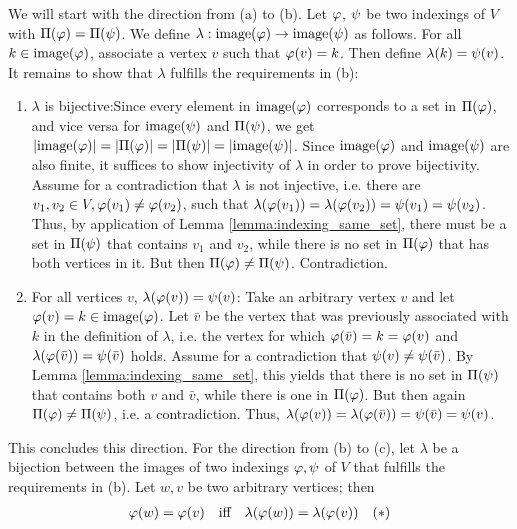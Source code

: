 \begin{\appendixproof}
    We will start with the direction from (a) to (b). Let $\varphi$, $\psi$ be two indexings of $V$ with $\Pi(\varphi) = \Pi(\psi)$. We define $\lambda : \mathrm{image}(\varphi)\rightarrow \mathrm{image}(\psi)$ as follows. For all $k \in \mathrm{image}(\varphi)$, associate a vertex $v$ such that $\varphi(v)=k$. Then define $\lambda(k)=\psi(v)$. It remains to show that $\lambda$ fulfills the requirements in (b):
    \begin{enumerate}
        \item $\lambda$ is bijective:\quad Since every element in $\mathrm{image}(\varphi)$ corresponds to a set in $\Pi(\varphi)$, and vice versa for $\mathrm{image}(\psi)$ and $\Pi(\psi)$, we get $|\mathrm{image}(\varphi)|=|\Pi(\varphi)|=|\Pi(\psi)|=|\mathrm{image}(\psi)|$. Since $\mathrm{image}(\varphi)$ and $\mathrm{image}(\psi)$ are also finite, it suffices to show injectivity of $\lambda$ in order to prove bijectivity. Assume for a contradiction that $\lambda$ is not injective, i.e. there are $v_1,v_2 \in V, \varphi(v_1) \neq \varphi(v_2)$, such that $\lambda(\varphi(v_1))=\lambda(\varphi(v_2))=\psi(v_1)=\psi(v_2)$. Thus, by application of Lemma \ref{lemma:indexing_same_set}, there must be a set in $\Pi(\psi)$ that contains $v_1$ and $v_2$, while there is no set in $\Pi(\varphi)$ that has both vertices in it. But then $\Pi(\varphi)\neq \Pi(\psi)$. Contradiction.
        \item For all vertices $v$, $\lambda(\varphi(v)) = \psi(v)$: \quad Take an arbitrary vertex $v$ and let $\varphi(v) = k \in \mathrm{image}(\varphi)$. Let $\bar{v}$ be the vertex that was previously associated with $k$ in the definition of $\lambda$, i.e. the vertex for which $\varphi(\bar{v})=k = \varphi(v)$ and $\lambda(\varphi(\bar{v}))=\psi(\bar{v})$ holds. Assume for a contradiction that $\psi(v)\neq \psi(\bar{v})$. By Lemma \ref{lemma:indexing_same_set}, this yields that there is no set in $\Pi(\psi)$ that contains both $v$ and $\bar{v}$, while there is one in $\Pi(\varphi)$. But then again $\Pi(\varphi) \neq \Pi(\psi)$, i.e. a contradiction. Thus, $\lambda(\varphi(v)) = \lambda(\varphi(\bar{v})) = \psi(\bar{v}) = \psi(v)$. 
    \end{enumerate}
    This concludes this direction. For the direction from (b) to (c), let $\lambda$ be a bijection between the images of two indexings $\varphi, \psi$ of $V$ that fulfills the requirements in (b). Let $w,v$ be two arbitrary vertices; then
    \begin{align*}
        \idx(w) = \idx(v) &\quad\text{iff}\quad \lambda(\idx(w)) = \lambda(\idx(v)) &(*) \\ 

\end{align*}
\end{\appendixproof}
